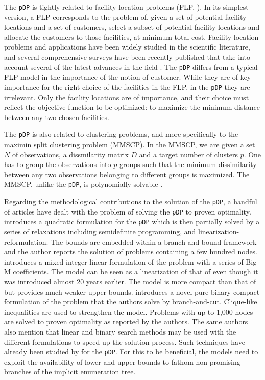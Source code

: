 \documentclass[a4paper,10pt]{article}
\newcommand{\pDP}{\texttt{pDP}}
\begin{document}
The \pDP{} is tightly related to facility location problems (FLP, \citet{Laporte2015Location}). In its simplest version, a FLP corresponds to the problem of, given a set of potential facility locations and a set of customers, select a subset of potential facility locations and allocate the customers to those facilities, at minimum total cost. Facility location problems and applications have been widely studied in the scientific literature, and several comprehensive surveys have been recently published that take into account several of the latest advances in the field \citep{Laporte2015Location, Melo2009Facility}. The \pDP{} differs from a typical FLP model in the importance of the notion of customer. While they are of key importance for the right choice of the facilities in the FLP, in the \pDP{} they are irrelevant. Only the facility locations are of importance, and their choice must reflect the objective function to be optimized: to maximize the minimum distance between any two chosen facilities. 

The \pDP{} is also related to clustering problems, and more specifically to the maximin split clustering problem (MMSCP). In the MMSCP, we are given a set $N$ of observations, a dissmilarity matrix $D$ and a target number of clusters $p$. One has to group the observations into $p$ groups such that the minimum dissimilarity between any two observations belonging to different groups is maximized. The MMSCP, unlike the \pDP{}, is polynomially solvable \citep{Delattre1980Bicriterion}.

Regarding the methodological contributions to the solution of the \pDP{}, a handful of articles have dealt with the problem of solving the \pDP{} to proven optimality. \citet{Pisinger2006Upper} introduces a quadratic formulation for the \pDP{} which is then partially solved by a series of relaxations including semidefinite programming, and linearization-reformulation. The bounds are embedded within a branch-and-bound framework and the author reports the solution of problems containing a few hundred nodes. \citet{Kuby1987Programming} introduces a mixed-integer linear formulation of the problem with a series of Big-M coefficients. The model can be seen as a linearization of that of \citet{Pisinger2006Upper} even though it was introduced almost 20 years earlier. The model is more compact than that of \citet{Pisinger2006Upper} but provides much weaker upper bounds. \citet{Sayah2017new} introduces a novel pure binary compact formulation of the problem that the authors solve by branch-and-cut. Clique-like inequalities are used to strengthen the model. Problems with up to 1,000 nodes are solved to proven optimality as reported by the authors. The same authors also mention that linear and binary search methods may be used with the different formulations to speed up the solution process. Such techniques have already been studied by \citet{Chandrasekaran1981Location, Pisinger2006Upper} for the \pDP{}. For this to be beneficial, the models need to exploit the availability of lower and upper bounds to fathom non-promising branches of the implicit enumeration tree.
\end{document}
